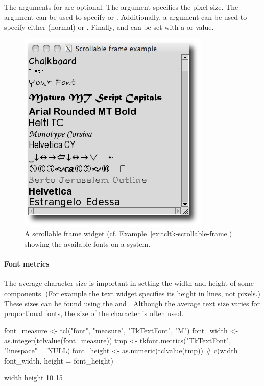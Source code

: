 The arguments for  are optional. The
 argument specifies the pixel size. The
 argument can be used to specify
 or .  Additionally, a
 argument can be used to specify either
 (normal) or . Finally,
 and
 can be set with a  or
 value.


\begin{figure}
  \centering
  \includegraphics[width=.6\textwidth]{fig-tcltk-all-fonts.png}
  \caption{A scrollable frame widget (cf. Example~\ref{ex:tcltk-scrollable-frame}) showing the available fonts on a system.}
  \label{fig:fig-tcltk-all-fonts}
\end{figure}


\paragraph{Font metrics}
The average character size is important in setting the width and
height of some components. (For example the text widget specifies its
height in lines, not pixels.) These sizes can be found using the
 and . Although the
average text size varies for proportional fonts, the size of the
 character is often used.
\begin{Schunk}
\begin{Sinput}
 font_measure <- tcl("font", "measure", "TkTextFont", "M")
 font_width <- as.integer(tclvalue(font_measure))
 tmp <- tkfont.metrics("TkTextFont", "linespace" = NULL)
 font_height <- as.numeric(tclvalue(tmp))
 #
 c(width = font_width, height = font_height)
\end{Sinput}
\begin{Soutput}
 width height 
    10     15 
\end{Soutput}
\end{Schunk}


